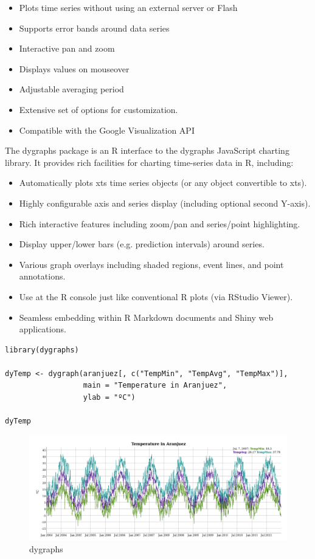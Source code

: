 \documentclass[smallroyalvopaper]{memoir}
\begin{document}
\begin{itemize}
\item Plots time series without using an external server or Flash
\item Supports error bands around data series
\item Interactive pan and zoom
\item Displays values on mouseover
\item Adjustable averaging period
\item Extensive set of options for customization.
\item Compatible with the Google Visualization API
\end{itemize}

The dygraphs package is an R interface to the dygraphs JavaScript charting library. It provides rich facilities for charting time-series data in R, including:

\begin{itemize}
\item Automatically plots xts time series objects (or any object convertible to xts).
\item Highly configurable axis and series display (including optional second Y-axis).
\item Rich interactive features including zoom/pan and series/point highlighting.
\item Display upper/lower bars (e.g. prediction intervals) around series.
\item Various graph overlays including shaded regions, event lines, and point annotations.
\item Use at the R console just like conventional R plots (via RStudio Viewer).
\item Seamless embedding within R Markdown documents and Shiny web applications.
\end{itemize}

\lstset{language=r,label= ,caption= ,captionpos=b,numbers=none}
\begin{lstlisting}
library(dygraphs)

dyTemp <- dygraph(aranjuez[, c("TempMin", "TempAvg", "TempMax")],
                  main = "Temperature in Aranjuez",
                  ylab = "ºC")

dyTemp
\end{lstlisting}
\begin{figure}[htbp]
\centering
\includegraphics[width=.9\linewidth]{figs/dygraphs_aranjuez.png}
\caption{dygraphs \label{fig:dygraphs}}
\end{figure}
\end{document}
